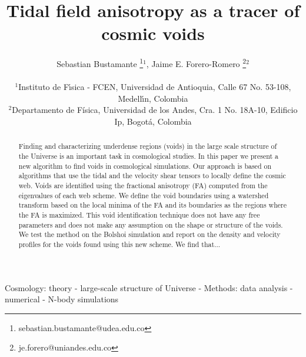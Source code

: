 \documentclass[a4,useAMS,usenatbib,usegraphicx]{mn2e}
\begin{document}
\title{Tidal field anisotropy as a tracer of cosmic voids}
\author[S. Bustamante and J.E. Forero-Romero]{
\parbox[t]{\textwidth}{\raggedright 
  Sebastian Bustamante \thanks{sebastian.bustamante@udea.edu.co}$^{1}$,
  Jaime E. Forero-Romero \thanks{je.forero@uniandes.edu.co}$^{2}$ 
}
\vspace*{6pt}\\
$^1$Instituto de F\'{\i}sica - FCEN, Universidad de Antioquia, Calle
67 No. 53-108, Medell\'{\i}n, Colombia\\ 
$^2$Departamento de F\'{i}sica, Universidad de los Andes, Cra. 1
No. 18A-10, Edificio Ip, Bogot\'a, Colombia
}

\maketitle

\begin{abstract}
Finding and characterizing underdense regions (voids) in the large
scale structure of the Universe is an important task in cosmological
studies.  
In this paper we present a new algorithm to find voids in
cosmological simulations.  
Our approach is based on algorithms that use the tidal and the
velocity shear tensors to locally define the cosmic web.
Voids are identified using the fractional anisotropy (FA) computed
from the eigenvalues of each web scheme. 
We define the void boundaries using a watershed transform based on the
local minima of the FA and its boundaries as the regions where the FA
is maximized.
This void identification technique does not have any free parameters
and does not make any assumption on the shape or structure of the
voids.  
We test the method on the Bolshoi simulation and report on the density
and velocity profiles for the voids found using this new scheme. 
We find that...
\end{abstract}

\begin{keywords}
Cosmology: theory - large-scale structure of Universe -
Methods: data analysis - numerical - N-body simulations
\end{keywords}


\end{document}

